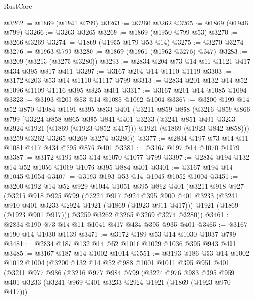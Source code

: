 \begin{lexlean}{RustCore}
\begin{coremodule}
@3262 := @1869 (@1941 @799)
@3263 := @3260 @3262
@3265 := @1869 (@1946 @799)
@3266 := @3263 @3265
@3269 := @1869 (@1950 @799 @53)
@3270 := @3266 @3269
@3274 := @1869 (@1955 @179 @53 @14)
@3275 := @3270 @3274
@3276 := @1963 @799
@3280 := @1869 (@1961 (@1962 @3276) @347)
@3283 := @3209 (@3213 (@3275 @3280))
@3293 := @2834 @204 @73 @14 @11 @1121 @417 @434 @395 @817 @401
@3297 := @3167 @204 @14 @1110 @1119
@3303 := @3172 @203 @53 @14 @1110 @1117 @799
@3313 := @2834 @201 @132 @14 @52 @1096 @1109 @1116 @395 @825 @401
@3317 := @3167 @201 @14 @1085 @1094
@3323 := @3193 @200 @53 @14 @1085 @1092 @1004
@3367 := @3200
    @199
    @14
    @52
    @870
    @1084
    @1091
    @395
    @833
    @401
    (@3211
      @859
      @868
      (@3216
        @859
        @866
        @799
        (@3224
          @858
          @865
          @395
          @841
          @401
          @3233
          (@3241 @851 @401 @3233 @2924 @1921 (@1869 (@1923 @852 @417)))
          @1921
          (@1869 (@1923 @842 @858)))
        @3259
        @3262
        @3265
        @3269
        @3274
        @3280))
@3377 := @2834 @197 @73 @14 @11 @1081 @417 @434 @395 @876 @401
@3381 := @3167 @197 @14 @1070 @1079
@3387 := @3172 @196 @53 @14 @1070 @1077 @799
@3397 := @2834 @194 @132 @14 @52 @1056 @1069 @1076 @395 @884 @401
@3401 := @3167 @194 @14 @1045 @1054
@3407 := @3193 @193 @53 @14 @1045 @1052 @1004
@3451 := @3200
    @192
    @14
    @52
    @929
    @1044
    @1051
    @395
    @892
    @401
    (@3211
      @918
      @927
      (@3216
        @918
        @925
        @799
        (@3224
          @917
          @924
          @395
          @900
          @401
          @3233
          (@3241 @910 @401 @3233 @2924 @1921 (@1869 (@1923 @911 @417)))
          @1921
          (@1869 (@1923 @901 @917)))
        @3259
        @3262
        @3265
        @3269
        @3274
        @3280))
@3461 := @2834 @190 @73 @14 @11 @1041 @417 @434 @395 @935 @401
@3465 := @3167 @190 @14 @1030 @1039
@3471 := @3172 @189 @53 @14 @1030 @1037 @799
@3481 := @2834 @187 @132 @14 @52 @1016 @1029 @1036 @395 @943 @401
@3485 := @3167 @187 @14 @1002 @1014
@3551 := @3193
    @186
    @53
    @14
    @1002
    @1012
    @1004
    (@3200
      @132
      @14
      @52
      @988
      @1001
      @1011
      @395
      @951
      @401
      (@3211
        @977
        @986
        (@3216
          @977
          @984
          @799
          (@3224
            @976
            @983
            @395
            @959
            @401
            @3233
            (@3241 @969 @401 @3233 @2924 @1921 (@1869 (@1923 @970 @417)))

\end{coremodule}
\end{lexlean}
